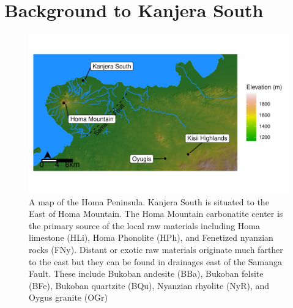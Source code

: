 \documentclass[]{elsarticle} %
\makeatletter
\def\maxwidth{\ifdim\Gin@nat@width>\linewidth\linewidth
\else\Gin@nat@width\fi}
\let\Oldincludegraphics\includegraphics
\renewcommand{\includegraphics}[1]{\Oldincludegraphics[width=\maxwidth]{#1}}
\makeatother
\begin{document}
\hypertarget{background-to-kanjera-south}{%
\section{Background to Kanjera
South}\label{background-to-kanjera-south}}

\begin{figure}
\centering
\includegraphics{Reeves_Braun_et_al_2020_Kanjera_South_JHE_files/figure-latex/unnamed-chunk-2-1.pdf}
\caption{A map of the Homa Peninsula. Kanjera South is situated to the
East of Homa Mountain. The Homa Mountain carbonatite center is the
primary source of the local raw materials including Homa limestone
(HLi), Homa Phonolite (HPh), and Fenetized nyanzian rocks (FNy). Distant
or exotic raw materials originate much farther to the east but they can
be found in drainages east of the Samanga Fault. These include Bukoban
andesite (BBa), Bukoban felsite (BFe), Bukoban quartzite (BQu), Nyanzian
rhyolite (NyR), and Oygus granite (OGr) \label{map}}
\end{figure}
\end{document}
